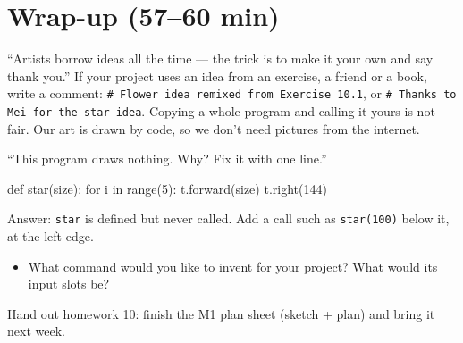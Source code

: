\section{Wrap-up (57--60 min)}
\begin{safety}
\enquote{Artists borrow ideas all the time --- the trick is to make it your own and say thank you.} If your project uses an idea from an exercise, a friend or a book, write a comment: \texttt{\# Flower idea remixed from Exercise 10.1}, or \texttt{\# Thanks to Mei for the star idea}. Copying a whole program and calling it yours is not fair. Our art is drawn by code, so we don't need pictures from the internet.
\end{safety}
\begin{formativecheck}
\enquote{This program draws nothing. Why? Fix it with one line.}
\begin{pycode}
def star(size):
    for i in range(5):
        t.forward(size)
        t.right(144)
\end{pycode}
Answer: \texttt{star} is defined but never called. Add a call such as \texttt{star(100)} below it, at the left edge.
\end{formativecheck}
\begin{reflection}
\begin{itemize}[leftmargin=1.2em,itemsep=1pt]
  \item What command would you like to invent for your project? What would its input slots be?
\end{itemize}
Hand out homework 10: finish the M1 plan sheet (sketch + plan) and bring it next week.
\end{reflection}

